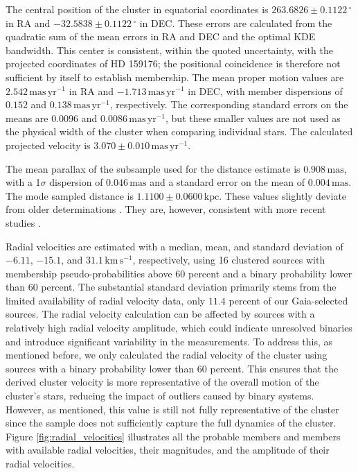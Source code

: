\documentclass{aa}
\begin{document}
The central position of the cluster in equatorial coordinates is $263.6826 \pm 0.1122\,^\circ$ in RA and $-32.5838 \pm 0.1122\,^\circ$ in DEC. These errors are calculated from the quadratic sum of the mean errors in RA and DEC and the optimal KDE bandwidth. This center is consistent, within the quoted uncertainty, with the projected coordinates of HD 159176; the positional coincidence is therefore not sufficient by itself to establish membership. The mean proper motion values are $2.542\,\mathrm{mas\,yr^{-1}}$ in RA and $-1.713\,\mathrm{mas\,yr^{-1}}$ in DEC, with member dispersions of $0.152$ and $0.138\,\mathrm{mas\,yr^{-1}}$, respectively. The corresponding standard errors on the means are $0.0096$ and $0.0086\,\mathrm{mas\,yr^{-1}}$, but these smaller values are not used as the physical width of the cluster when comparing individual stars. The calculated projected velocity is $3.070 \pm 0.010\,\mathrm{mas\,yr^{-1}}$.

The mean parallax of the subsample used for the distance estimate is $0.908\,\mathrm{mas}$, with a 1$\sigma$ dispersion of $0.046\,\mathrm{mas}$ and a standard error on the mean of $0.004\,\mathrm{mas}$. The mode sampled distance is $1.1100 \pm 0.0600\,\mathrm{kpc}$. These values slightly deviate from older determinations \citep{1930LicOB..14..154T,1949ApJ...110..117S,1978MNRAS.182..607F,1985AA...151..391T,2007AA...462..157P}. They are, however, consistent with more recent studies \citep{1971AAS....4..241B,2005AA...438.1163K,2008AA...477..165P,2021ApJ...923..129J,2022ApJS..262....7H,2024arXiv240301030P,2024arXiv240305143H}.

Radial velocities are estimated with a median, mean, and standard deviation of $-6.11$, $-15.1$, and $31.1 \,\mathrm{km}\,\mathrm{s}^{-1}$, respectively, using 16 clustered sources with membership pseudo-probabilities above $60$ percent and a binary probability lower than $60$ percent. The substantial standard deviation primarily stems from the limited availability of radial velocity data, only $11.4$ percent of our Gaia-selected sources. The radial velocity calculation can be affected by sources with a relatively high radial velocity amplitude, which could indicate unresolved binaries and introduce significant variability in the measurements. To address this, as mentioned before, we only calculated the radial velocity of the cluster using sources with a binary probability lower than $60$ percent. This ensures that the derived cluster velocity is more representative of the overall motion of the cluster's stars, reducing the impact of outliers caused by binary systems. However, as mentioned, this value is still not fully representative of the cluster since the sample does not sufficiently capture the full dynamics of the cluster. Figure \ref{fig:radial_velocities} illustrates all the probable members and members with available radial velocities, their magnitudes, and the amplitude of their radial velocities.
\end{document}
